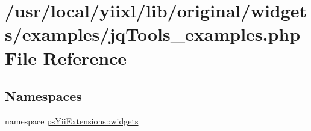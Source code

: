 \hypertarget{jqTools__examples_8php}{
\section{/usr/local/yiixl/lib/original/widgets/examples/jqTools\_\-examples.php File Reference}
\label{jqTools__examples_8php}
}
\subsection*{Namespaces}
\begin{DoxyCompactItemize}
\item 
namespace \hyperlink{namespacepsYiiExtensions_1_1widgets}{psYiiExtensions::widgets}
\end{DoxyCompactItemize}
